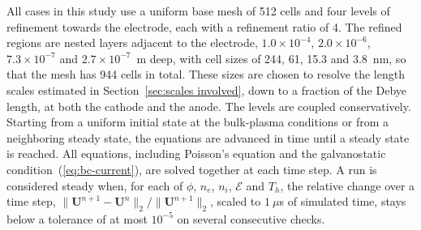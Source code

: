 All cases in this study use a uniform base mesh of 512 cells and four levels of refinement towards the electrode, each with a refinement ratio of 4. The refined regions are nested layers adjacent to the electrode, \(1.0\times10^{-4}\), \(2.0\times10^{-6}\), \(7.3\times10^{-7}\) and \(2.7\times10^{-7}\)~m deep, with cell sizes of 244, 61, 15.3 and 3.8~nm, so that the mesh has 944 cells in total. These sizes are chosen to resolve the length scales estimated in Section~\ref{sec:scales involved}, down to a fraction of the Debye length, at both the cathode and the anode. The levels are coupled conservatively. Starting from a uniform initial state at the bulk-plasma conditions or from a neighboring steady state, the equations are advanced in time until a steady state is reached. All equations, including Poisson's equation and the galvanostatic condition~(\ref{eq:bc-current}), are solved together at each time step. A run is considered steady when, for each of \(\phi\), \(n_e\), \(n_i\), \(\mathcal{E}\) and \(T_h\), the relative change over a time step, \(\|\mathbf{U}^{n+1}-\mathbf{U}^{n}\|_2/\|\mathbf{U}^{n+1}\|_2\), scaled to \(1\ \mu\)s of simulated time, stays below a tolerance of at most \(10^{-5}\) on several consecutive checks.
